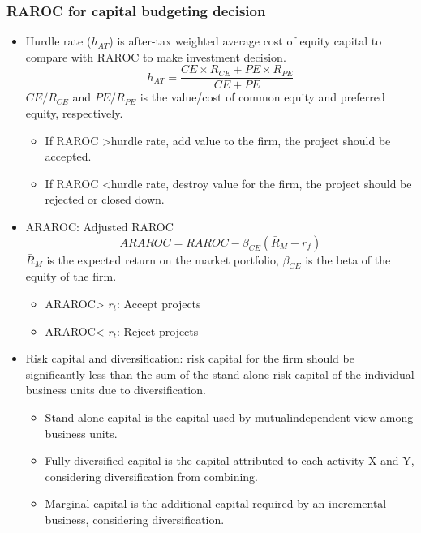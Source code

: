 \subsubsection{RAROC for capital budgeting decision}
\begin{itemize}
\item Hurdle rate ($h_{AT}$) is after-tax weighted average cost of equity capital to compare with RAROC to make investment decision.
\begin{equation}
    h_{AT} = \frac{CE \times R_{CE} + PE \times R_{PE}}{CE + PE}
    \end{equation}
$CE/R_{CE}$ and $PE/R_{PE}$ is the value/cost of common equity and preferred equity, respectively.
    \begin{itemize}
    \item If RAROC >hurdle rate, add value to the firm, the project should be accepted.
    \item If RAROC <hurdle rate, destroy value for the firm, the project should be rejected or closed down.
    \end{itemize}
\item ARAROC: Adjusted RAROC
    \begin{equation}
    ARAROC = RAROC - \beta_{CE} \left( \bar{R}_{M} - r_{f} \right)
    \end{equation}
\(\bar{R}_{M}\) is the expected return on the market portfolio, \(\beta_{CE}\) is the beta of the equity of the firm.
    \begin{itemize}
    \item ARAROC> $r_t$: Accept projects
    \item ARAROC< $r_t$: Reject projects
    \end{itemize}
\item Risk capital and diversification: risk capital for the firm should be significantly less than the sum of the stand-alone risk capital of the individual business units due to diversification.
    \begin{itemize}
    \item Stand-alone capital is the capital used by mutualindependent view among business units.
    \item Fully diversified capital is the capital attributed to each activity X and Y, considering diversification from combining.
    \item Marginal capital is the additional capital required by an incremental business, considering diversification.
    \end{itemize}
\end{itemize}


